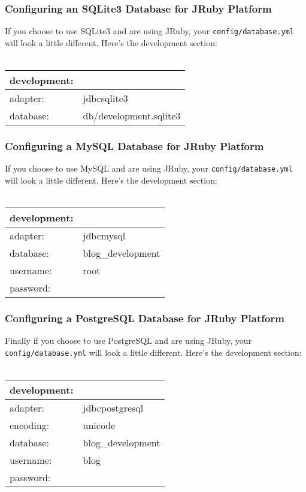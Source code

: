 \documentclass[10pt]{book}
\begin{document}
\subsubsection{ Configuring an SQLite3 Database for JRuby Platform}

If you choose to use SQLite3 and are using JRuby, your \texttt{config/database.yml} will look a little different. Here’s the development section:
\\ \\
\begin{tabular}{ll}
development:\\
\hline
adapter: & jdbcsqlite3\\
database: & db/development.sqlite3\\
\end{tabular}

\subsubsection{ Configuring a MySQL Database for JRuby Platform}

If you choose to use MySQL and are using JRuby, your \texttt{config/database.yml} will look a little different. Here’s the development section:
\\ \\
\begin{tabular}{ll}
development:\\
\hline
adapter: & jdbcmysql\\
database: & blog\_development\\
username: & root\\
password:
\end{tabular}

\subsubsection{ Configuring a PostgreSQL Database for JRuby Platform}

Finally if you choose to use PostgreSQL and are using JRuby, your \texttt{config/database.yml} will look a little different. Here’s the development section:
\\ \\
\begin{tabular}{ll}
development:\\
\hline
adapter: & jdbcpostgresql\\
encoding: & unicode\\
database: & blog\_development\\
username: & blog\\
password:
\end{tabular}
\\
\end{document}
